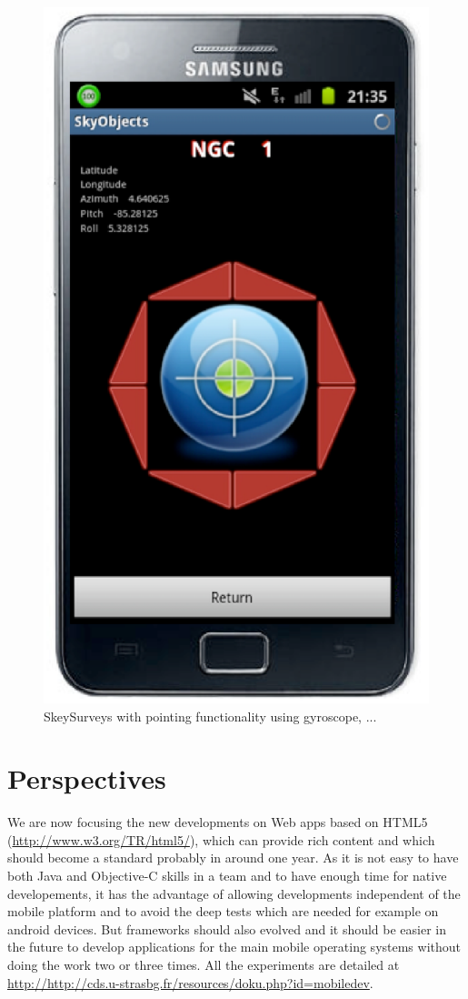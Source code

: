 \documentclass[11pt,twoside]{article}
\begin{document}
\begin{figure}[h]
\includegraphics[scale=0.28]{O28_f6.eps}
\caption{SkeySurveys with pointing functionality using gyroscope, ...} 
\label{O28:3}
\end{figure}

\section{Perspectives}
We are now focusing the new developments on Web apps based on HTML5 (\url{http://www.w3.org/TR/html5/}), which can provide rich content and which should become a standard probably in around one year. As it is not easy to have both Java and Objective-C skills in a team and to have enough time for native developements, it has the advantage of allowing developments independent of the mobile platform and to avoid the deep tests which are needed for example on android devices. 
But frameworks should also evolved and it should be easier in the future to develop applications for the main mobile operating systems without doing the work two or three times.
All the experiments are detailed at \url{http://http://cds.u-strasbg.fr/resources/doku.php?id=mobiledev}.
\end{document}

